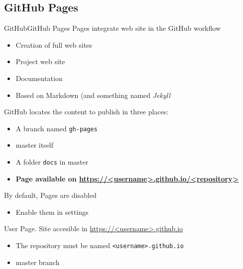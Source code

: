\documentclass[10pt,compress]{beamer} %
\begin{document}
\subsection{GitHub Pages}

\begin{frame}{GitHub}{GitHub Pages}
	Pages integrate web site in the GitHub workflow
	\begin{itemize}
		\item Creation of full web sites
		\item Project web site
		\item Documentation
		\item Based on Markdown (and something named \textit{Jekyll}
	\end{itemize}

	GitHub locates the content to publish in three places:
	\begin{itemize}
		\item A branch named \texttt{gh-pages}
		\item master itself
		\item A folder \texttt{docs} in master
		\item \textbf{Page available on \url{https://<username>.github.io/<repository>}}
	\end{itemize}

	By default, Pages are disabled 
	\begin{itemize}
		\item Enable them in settings
	\end{itemize}

	User Page. Site accesible in \url{https://<username>.github.io}
	\begin{itemize}
		\item The repository must be named \texttt{<username>.github.io}
		\item master branch
	\end{itemize}
\end{frame}

%
%


\end{document}
